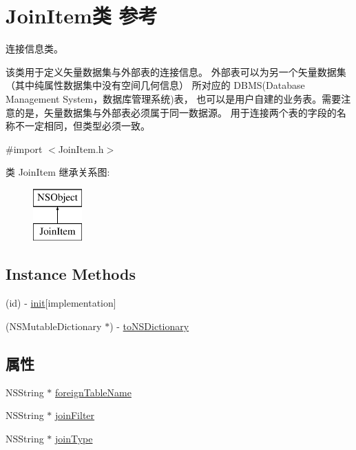 \hypertarget{interface_join_item}{\section{Join\-Item类 参考}
\label{interface_join_item}
}


连接信息类。\par
 该类用于定义矢量数据集与外部表的连接信息。 外部表可以为另一个矢量数据集（其中纯属性数据集中没有空间几何信息） 所对应的 D\-B\-M\-S(Database Management System，数据库管理系统)表， 也可以是用户自建的业务表。需要注意的是，矢量数据集与外部表必须属于同一数据源。 用于连接两个表的字段的名称不一定相同，但类型必须一致。  




{\ttfamily \#import $<$Join\-Item.\-h$>$}

类 Join\-Item 继承关系图\-:\begin{figure}[H]
\begin{center}
\leavevmode
\includegraphics[height=2.000000cm]{interface_join_item}
\end{center}
\end{figure}
\subsection*{Instance Methods}
\begin{DoxyCompactItemize}
\item 
(id) -\/ \hyperlink{interface_join_item_ae6b4f0aecf479050c8cf18170d754554}{init}{\ttfamily  \mbox{[}implementation\mbox{]}}
\item 
(N\-S\-Mutable\-Dictionary $\ast$) -\/ \hyperlink{interface_join_item_a65aa7b6f8fcc79b10406687c599faede}{to\-N\-S\-Dictionary}
\end{DoxyCompactItemize}
\subsection*{属性}
\begin{DoxyCompactItemize}
\item 
N\-S\-String $\ast$ \hyperlink{interface_join_item_a19fdae54d25724191c1f1a253d8283c5}{foreign\-Table\-Name}
\item 
N\-S\-String $\ast$ \hyperlink{interface_join_item_a2dfc110b26f4cf48aeae6cee0c1686ec}{join\-Filter}
\item 
N\-S\-String $\ast$ \hyperlink{interface_join_item_a6aa4f1788a48780bf34a84fa58253057}{join\-Type}
\end{DoxyCompactItemize}



